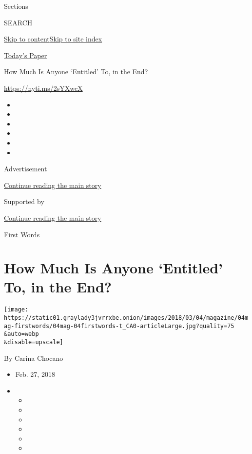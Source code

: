 Sections

SEARCH

\protect\hyperlink{site-content}{Skip to
content}\protect\hyperlink{site-index}{Skip to site index}

\href{https://myaccount.nytimes3xbfgragh.onion/auth/login?response_type=cookie\&client_id=vi}{}

\href{https://www.nytimes3xbfgragh.onion/section/todayspaper}{Today's
Paper}

How Much Is Anyone `Entitled' To, in the End?

\url{https://nyti.ms/2sYXwcX}

\begin{itemize}
\item
\item
\item
\item
\item
\item
\end{itemize}

Advertisement

\protect\hyperlink{after-top}{Continue reading the main story}

Supported by

\protect\hyperlink{after-sponsor}{Continue reading the main story}

\href{/column/first-words}{First Words}

\hypertarget{how-much-is-anyone-entitled-to-in-the-end}{%
\section{How Much Is Anyone `Entitled' To, in the
End?}\label{how-much-is-anyone-entitled-to-in-the-end}}

\texttt{[image: https://static01.graylady3jvrrxbe.onion/images/2018/03/04/magazine/04mag-firstwords/04mag-04firstwords-t\_CA0-articleLarge.jpg?quality=75\\\&auto=webp\\\&disable=upscale]}

By Carina Chocano

\begin{itemize}
\item
  Feb. 27, 2018
\item
  \begin{itemize}
  \item
  \item
  \item
  \item
  \item
  \item
  \end{itemize}
\end{itemize}


